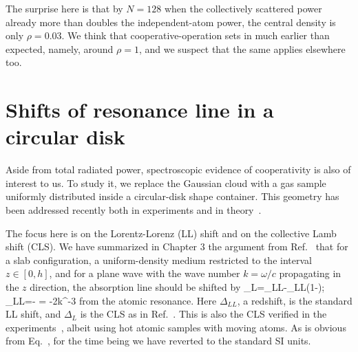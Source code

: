 The surprise here is that by $N=128$ when the collectively scattered power already more than doubles the independent-atom power, the central density is only $\rho=0.03$. We think that cooperative-operation sets in much earlier than expected, namely, around $\rho=1$, and we suspect that the same applies elsewhere too.


 

\section{Shifts of resonance line in a circular disk}

Aside from total radiated power, spectroscopic evidence of cooperativity is also of interest to us. To study it, we replace the Gaussian cloud with a gas sample uniformly distributed inside a circular-disk shape container. This geometry has been addressed recently both in experiments and in theory~\cite{PhysRevLett.108.173601,Javanainen:16}.

The focus here is on the Lorentz-Lorenz (LL) shift and on the collective Lamb shift (CLS). 
We have summarized in Chapter 3 the argument from Ref.~\cite{FRIEDBERG1973101} that for a slab configuration, a uniform-density medium restricted to the interval $z\in [0,h]$, and for a plane wave with the wave number $k=\omega/c$ propagating in the $z$ direction, the absorption line should be shifted by
\bea
\Delta_L=\Delta_{LL}-\Delta_{LL}\left(1-\right);\,\quad\Delta_{LL}=- = -2\pi\rho k^{-3}\gamma
\label{LL_CLS}
\eea
from the atomic resonance. Here $\Delta_{LL}$, a redshift, is the standard LL shift, and $\Delta_L$ is the CLS as in Ref.~\cite{FRIEDBERG1973101}.  This is also the CLS verified in the experiments~\cite{PhysRevLett.108.173601}, albeit using hot atomic samples with moving atoms. As is obvious from Eq.~, for the time being we have reverted to the standard SI units.

